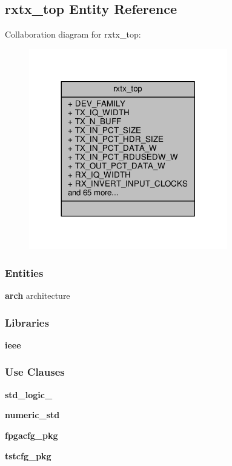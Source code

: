 \subsection{rxtx\+\_\+top Entity Reference}
\label{classrxtx__top}


Collaboration diagram for rxtx\+\_\+top\+:\nopagebreak
\begin{figure}[H]
\begin{center}
\leavevmode
\includegraphics[width=245pt]{df/d3b/classrxtx__top__coll__graph}
\end{center}
\end{figure}
\subsubsection*{Entities}
\begin{DoxyCompactItemize}
\item 
{\bf arch} architecture
\end{DoxyCompactItemize}
\subsubsection*{Libraries}
 \begin{DoxyCompactItemize}
\item 
{\bf ieee} 
\end{DoxyCompactItemize}
\subsubsection*{Use Clauses}
 \begin{DoxyCompactItemize}
\item 
{\bf std\+\_\+logic\+\_}   
\item 
{\bf numeric\+\_\+std}   
\item 
{\bf fpgacfg\+\_\+pkg}   
\item 
{\bf tstcfg\+\_\+pkg}   
\end{DoxyCompactItemize}
